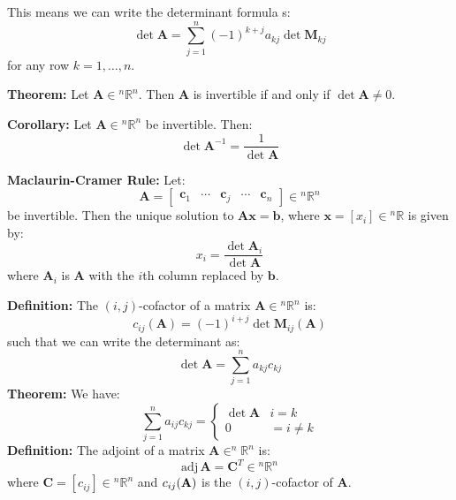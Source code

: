 \documentclass{article}
\newcommand{\bff}[1]{\mathbf{#1}}
\newcommand{\adj}[1]{\mathrm{adj}\,#1}
\begin{document}
    \begin{minipage}[t]{0.45\linewidth}
        This means we can write the determinant formula s:
        \begin{equation*}
            \det \bff{A} = \sum_{j=1}^n (-1)^{k+j}a_{kj} \det \bff{M}_{kj}
        \end{equation*}
        for any row $k=1,\dots,n$.
        \vspace{2mm}

        \textbf{Theorem:} Let $\bff{A} \in {^n}\mathbb{R}^n$. Then $\bff{A}$ is invertible if and only if $\det \bff{A} \neq 0$.
        \vspace{2mm}

        \textbf{Corollary:} Let $\bff{A} \in {^n}\mathbb{R}^n$ be invertible. Then: $$\det \bff{A}^{-1} = \frac{1}{\det \bff{A}}$$

        \textbf{Maclaurin-Cramer Rule:} Let:
        \begin{equation*}
            \bff{A} = \begin{bmatrix}
                
                \bff{c}_1 & \cdots & \bff{c}_j & \cdots & \bff{c}_n
            \end{bmatrix} \in {^n}\mathbb{R}^n
        \end{equation*}
        be invertible. Then the unique solution to $\bff{Ax}=\bff{b}$, where $\bff{x}=[x_i] \in {^n}\mathbb{R}$ is given by:
        \begin{equation*}
            x_i = \frac{\det \bff{A}_i}{\det \bff{A}}
        \end{equation*}
        where $\bff{A}_i$ is $\bff{A}$ with the $i$th column replaced by $\bff{b}$.
        \vspace{2mm}

        \textbf{Definition:} The $(i,j)$-cofactor of a matrix $\bff{A} \in {^n}\mathbb{R}^n$ is:
        \begin{equation*}
            c_{ij}(\bff{A}) = (-1)^{i+j}\det \bff{M}_{ij}(\bff{A})
        \end{equation*}
        such that we can write the determinant as:
        \begin{equation*}
            \det \bff{A} = \sum_{j=1}^n a_{kj}c_{kj}
        \end{equation*}
        \textbf{Theorem:} We have:
        \begin{equation*}
            \sum_{j=1}^n a_{ij}c_{kj} = \begin{cases}
                \det \bff{A} & i=k \\ 
                0 &= i\neq k
            \end{cases}
        \end{equation*}
        \textbf{Definition:} The adjoint of a matrix $\bff{A} \in ^{n}\mathbb{R}^n$ is:
        \begin{equation*}
            \adj \bff{A} = \bff{C}^T \in {^n}\mathbb{R}^n
        \end{equation*}
        where $\bff{C}=[c_{ij}]\in {^n}\mathbb{R}^n$ and $c_{ij}\bf{(A)}$ is the $(i,j)$-cofactor of $\bff{A}$.
        \vspace{2mm}


\end{minipage}
\end{document}
